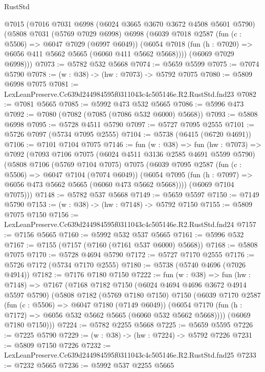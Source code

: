 \begin{lexlean}{RustStd}
\begin{coremodule}
  @7015
    (@7016
      @7031
      @6998
      (@6024 @3665 @3670 @3672 @4508 @5601 @5790)
      (@5808
        @7031
        (@5769 @7029 @6998)
        @6998
        (@6039
          @7018
          @2587
          (fun (c : @5506) => @6047 @7029 (@6997 @6049))
          (@6054 @7018 (fun (h : @7020) => @6056 @411 @5662 @5665 (@6060 @411 @5662 @5668))))
        (@6069 @7029 @6998)))
@7073 := @5782 @532 @5668
@7074 := @5659 @5599
@7075 := @7074 @5790
@7078 := (w : @38) -> (hw : @7073) -> @5792 @7075
@7080 := @5809 @6998 @7075
@7081 := LexLeanPreserve.Cc639d244984595f0311043c4c505146e.R2.RustStd.fnd23
@7082 := @7081 @5665
@7085 := @5992 @473 @532 @5665
@7086 := @5996 @473
@7092 := @7080 (@7082 (@7085 (@7086 @532 @6000) @5668))
@7093 := @5808 @6998
@7095 := @5728 @4511 @5790
@7097 := @5727 @7095 @2555
@7101 := @5726 @7097 (@5734 @7095 @2555)
@7104 := @5738 (@6415 (@6720 @4691))
@7106 := @7101 @7104 @7075
@7146 := fun (w : @38) =>
  fun (hw : @7073) =>
  @7092
    (@7093
      @7106
      @7075
      (@6024 @4511 @3136 @2585 @4691 @5599 @5790)
      (@5808
        @7106
        (@5769 @7104 @7075)
        @7075
        (@6039
          @7095
          @2587
          (fun (c : @5506) => @6047 @7104 (@7074 @6049))
          (@6054 @7095 (fun (h : @7097) => @6056 @473 @5662 @5665 (@6060 @473 @5662 @5668))))
        (@6069 @7104 @7075)))
@7148 := @5782 @537 @5668
@7149 := @5659 @5597
@7150 := @7149 @5790
@7153 := (w : @38) -> (hw : @7148) -> @5792 @7150
@7155 := @5809 @7075 @7150
@7156 := LexLeanPreserve.Cc639d244984595f0311043c4c505146e.R2.RustStd.fnd24
@7157 := @7156 @5665
@7160 := @5992 @532 @537 @5665
@7161 := @5996 @532
@7167 := @7155 (@7157 (@7160 (@7161 @537 @6000) @5668))
@7168 := @5808 @7075
@7170 := @5728 @4694 @5790
@7172 := @5727 @7170 @2555
@7176 := @5726 @7172 (@5734 @7170 @2555)
@7180 := @5738 (@5740 @4696 (@7026 @4914))
@7182 := @7176 @7180 @7150
@7222 := fun (w : @38) =>
  fun (hw : @7148) =>
  @7167
    (@7168
      @7182
      @7150
      (@6024 @4694 @4696 @3672 @4914 @5597 @5790)
      (@5808
        @7182
        (@5769 @7180 @7150)
        @7150
        (@6039
          @7170
          @2587
          (fun (c : @5506) => @6047 @7180 (@7149 @6049))
          (@6054 @7170 (fun (h : @7172) => @6056 @532 @5662 @5665 (@6060 @532 @5662 @5668))))
        (@6069 @7180 @7150)))
@7224 := @5782 @2255 @5668
@7225 := @5659 @5595
@7226 := @7225 @5790
@7229 := (w : @38) -> (hw : @7224) -> @5792 @7226
@7231 := @5809 @7150 @7226
@7232 := LexLeanPreserve.Cc639d244984595f0311043c4c505146e.R2.RustStd.fnd25
@7233 := @7232 @5665
@7236 := @5992 @537 @2255 @5665

\end{coremodule}
\end{lexlean}
